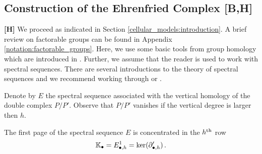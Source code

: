 \subsection{Construction of the Ehrenfried Complex [B,H]}
{\bf [H]} We proceed as indicated in Section \ref{cellular_models:introduction}.
A brief review on factorable groups can be found in Appendix \ref{notation:factorable_groups}.
Here, we use some basic tools from group homology which are introduced in \cite{Brown198211}.
Further, we assume that the reader is used to work with spectral sequences.
There are several introductions to the theory of spectral sequences and we recommend working through \cite[Chapter 5]{Weibel1995} or \cite[Chapter 9]{Spanier199412}.

Denote by $E$ the spectral sequence associated with the vertical homology of the double complex $P/P'$.
Observe that $P/P'$ vanishes if the vertical degree is larger then $h$.
\begin{defthm}
    \label{cellular_models:ehrenfried:E1_is_concentrated_in_a_single_row}
    The first page of the spectral sequence $E$ is concentrated in the $h^{\text{th}}$ row
    \[
        \mathbb K_\bullet = E^1_{\bullet,h} = \ker( \partial'_{\bullet,h})\,. 
    \]
\end{defthm}

